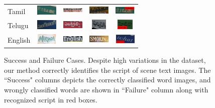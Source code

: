\begin{figure}[t!]
\begin{tabular}{|l||ccc||c|}
Tamil & \includegraphics[height=0.5cm,width=1.0cm]{figures/Results/Success/Tamil_3.jpg} & \includegraphics[height=0.5cm,width=1.0cm]{figures/Results/Success/Tamil_5.jpg} & \includegraphics[height=0.5cm,width=1.0cm]{figures/Results/Success/Tamil_1.jpg} & \includegraphics[height=0.5cm,width=1.0cm]{figures/Results/Failure/tam_mal.png} \\
Telugu & \includegraphics[height=0.5cm,width=1.0cm]{figures/Results/Success/Telugu_1.png} & \includegraphics[height=0.5cm,width=1.0cm]{figures/Results/Success/Telugu_2.png} & \includegraphics[height=0.5cm,width=1.0cm]{figures/Results/Success/Telugu_3.png} & \includegraphics[height=0.5cm,width=1.0cm]{figures/Results/Failure/telugu_kan_1.png} \\
English & \includegraphics[height=0.5cm,width=1.0cm]{figures/Results/Success/English_1.jpg} & \includegraphics[height=0.5cm,width=1.0cm]{figures/Results/Success/English_2.jpg} & \includegraphics[height=0.5cm,width=1.0cm]{figures/Results/Success/English_3.jpg} & \includegraphics[height=0.5cm,width=1.0cm]{figures/Results/Failure/eng_kan.png} \\
\hline

\end{tabular}
\caption{Success and Failure Cases. Despite high variations in the dataset, our method correctly identifies the script of scene text images. The ``Success" columns depicts the correctly classified word images, and wrongly classified words are shown in ``Failure" column along with recognized script in red boxes.}
  \label{fig:visRes1}
\end{figure}

